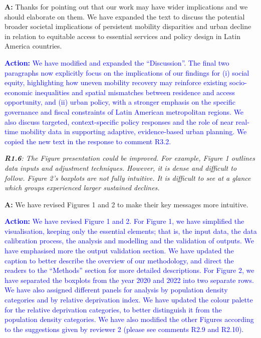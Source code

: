\documentclass[12pt,a4paper,oneside, reqno]{amsart}
\begin{document}
\setlength{\leftskip}{1cm}\textbf{A:} Thanks for pointing out that our work may have wider implications and we should elaborate on them. We have expanded the text to discuss the potential broader societal implications of persistent mobility disparities and urban decline in relation to equitable access to essential services and policy design in Latin America countries. 

\textcolor{blue}{
\textbf{Action:} We have modified and expanded the ``Discussion''. The final two paragraphs now explicitly focus on the implications of our findings for (i) social equity, highlighting how uneven mobility recovery may reinforce existing socio-economic inequalities and spatial mismatches between residence and access opportunity, and (ii) urban policy, with a stronger emphasis on the specific governance and fiscal constraints of Latin American metropolitan regions. We also discuss targeted, context-specific policy responses and the role of near real-time mobility data in supporting adaptive, evidence-based urban planning. We copied the new text in the response to comment R3.2.
}

\setlength{\leftskip}{0cm} \textit{\textbf{R1.6}: The Figure presentation could be improved. For example, Figure 1 outlines data inputs and adjustment techniques. However, it is dense and difficult to follow. Figure 2’s boxplots are not fully intuitive. It is difficult to see at a glance which groups experienced larger sustained declines.
}

\setlength{\leftskip}{1cm}\textbf{A:} We have revised Figures 1 and 2 to make their key messages more intuitive.

\textcolor{blue}{
\textbf{Action:} We have revised Figure 1 and 2. For Figure 1, we have simplified the visualisation, keeping only the essential elements; that is, the input data, the data calibration process, the analysis and modelling and the validation of outputs. We have emphasised more the output validation section. We have updated the caption to better describe the overview of our methodology, and direct the readers to the ``Methods'' section for more detailed descriptions. For Figure 2, we have separated the boxplots from the year 2020 and 2022 into two separate rows. We have also assigned different panels for analysis by population density categories and by relative deprivation index. We have updated the colour palette for the relative deprivation categories, to better distinguish it from the population density categories. We have also modified the other Figures according to the suggestions given by reviewer 2 (please see comments R2.9 and R2.10).
}
\end{document}

